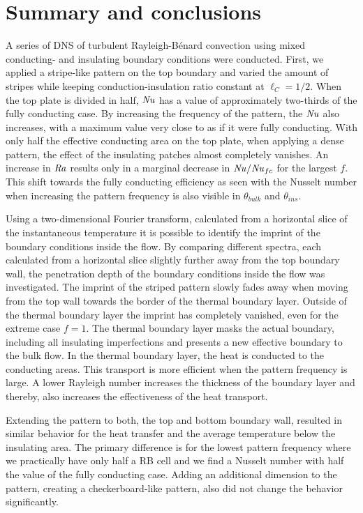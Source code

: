 \documentclass{jfm}
\newcommand\Ray{\mbox{\textit{Ra}}}  %
\newcommand\Nus{\mbox{\textit{Nu}}}  %
\begin{document}
\section{Summary and conclusions}\label{Conclusion}

A series of DNS of turbulent Rayleigh-B\'enard convection using mixed
conducting- and insulating boundary conditions were conducted.  First, we
applied a stripe-like pattern on the top boundary and varied the amount of
stripes while keeping conduction-insulation ratio constant at $\ell_C=1/2$.
When the top plate is divided in half, $\Nus$ has a value of approximately
two-thirds of the fully conducting case.  By increasing the frequency of the
pattern, the $\Nus$ also increases, with a maximum value very close to as if
it were fully conducting.  With only half the effective conducting area on the
top plate, when applying a dense pattern, the effect of the insulating patches
almost completely vanishes.  An increase in $\Ray$ results only in a marginal
decrease in $\Nus/\Nus_{fc}$ for the largest $f$.  This shift towards the
fully conducting efficiency as seen with the Nusselt number when increasing
the pattern frequency is also visible in $\theta_{bulk}$ and $\theta_{ins}$.

Using a two-dimensional Fourier transform, calculated from a horizontal slice
of the instantaneous temperature it is possible to identify the imprint of the
boundary conditions inside the flow.  By comparing different spectra, each
calculated from a horizontal slice slightly further away from the top boundary
wall, the penetration depth of the boundary conditions inside the flow was
investigated.  The imprint of the striped pattern slowly fades away when
moving from the top wall towards the border of the thermal boundary layer.
Outside of the thermal boundary layer the imprint has completely vanished,
even for the extreme case $f=1$.  The thermal boundary layer masks the actual
boundary, including all insulating imperfections and presents a new effective
boundary to the bulk flow.  In the thermal boundary layer, the heat is
conducted to the conducting areas.  This transport is more efficient when the
pattern frequency is large.  A lower Rayleigh number increases the thickness
of the boundary layer and thereby, also increases the effectiveness of the
heat transport.

Extending the pattern to both, the top and bottom boundary wall, resulted in
similar behavior for the heat transfer and the average temperature below the
insulating area.  The primary difference is for the lowest pattern frequency
where we practically have only half a RB cell and we find a Nusselt number
with half the value of the fully conducting case.  Adding an additional
dimension to the pattern, creating a checkerboard-like pattern, also did not
change the behavior significantly.
\end{document}
